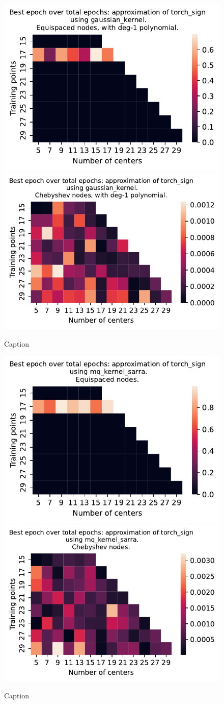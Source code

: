 \documentclass[12pt]{report} %
\begin{document}
\begin{figure}[ht]
  \centering

  \includegraphics[width=.49\textwidth]{imagenes/experiments/1d/variational_epochs/torch_sign-Kgaussian_kernel-Poly-Equi-epochs.pdf}
  \includegraphics[width=.49\textwidth]{imagenes/experiments/1d/variational_epochs/torch_sign-Kgaussian_kernel-Poly-Cheb-epochs.pdf}
  \caption{Caption}
  \label{fig:epochs-torch-sign-gaussian-poly}
\end{figure}


\begin{figure}[ht]
  \centering

  \includegraphics[width=.49\textwidth]{imagenes/experiments/1d/variational_epochs/torch_sign-Kmq_kernel_sarra-Equi-epochs.pdf}
  \includegraphics[width=.49\textwidth]{imagenes/experiments/1d/variational_epochs/torch_sign-Kmq_kernel_sarra-Cheb-epochs.pdf}
  \caption{Caption}
  \label{fig:epochs-torch-sign-sarra}
\end{figure}
\end{document}
